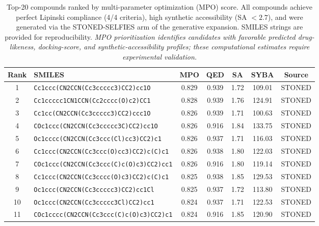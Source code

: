 \documentclass[journal=jcisd8,manuscript=suppinfo]{achemso}
\begin{document}
\begin{table}[!htbp]
\centering
\caption{Top-20 compounds ranked by multi-parameter optimization (MPO) score. All compounds achieve perfect Lipinski compliance (\num{4}/\num{4} criteria), high synthetic accessibility (SA $< \num{2.7}$), and were generated via the STONED-SELFIES arm of the generative expansion. SMILES strings are provided for reproducibility. \textit{MPO prioritization identifies candidates with favorable predicted drug-likeness, docking-score, and synthetic-accessibility profiles; these computational estimates require experimental validation.}}
\label{tab:top20_mpo}
\small
\begin{tabular}{@{}c p{8.25cm} c c c c c@{}}
\toprule
\textbf{Rank} & \textbf{SMILES} & \textbf{MPO} & \textbf{QED} & \textbf{SA} & \textbf{SYBA} & \textbf{Source} \\
\midrule
\num{1} & \texttt{Cc1ccc(CN2CCN(Cc3ccccc3)CC2)cc1O} & \num{0.829} & \num{0.939} & \num{1.72} & \num{109.01} & STONED \\
\num{2} & \texttt{Cc1ccccc1CN1CCN(Cc2cccc(O)c2)CC1} & \num{0.828} & \num{0.939} & \num{1.76} & \num{124.91} & STONED \\
\num{3} & \texttt{Cc1cc(CN2CCN(Cc3ccccc3)CC2)ccc1O} & \num{0.826} & \num{0.939} & \num{1.71} & \num{100.63} & STONED \\
\num{4} & \texttt{COc1ccc(CN2CCN(Cc3ccccc3C)CC2)cc1O} & \num{0.826} & \num{0.916} & \num{1.84} & \num{133.75} & STONED \\
\num{5} & \texttt{Oc1cccc(CN2CCN(Cc3ccc(Cl)cc3)CC2)c1} & \num{0.826} & \num{0.937} & \num{1.71} & \num{116.03} & STONED \\
\num{6} & \texttt{Cc1ccc(CN2CCN(Cc3ccc(O)cc3)CC2)c(C)c1} & \num{0.826} & \num{0.938} & \num{1.80} & \num{122.03} & STONED \\
\num{7} & \texttt{COc1ccc(CN2CCN(Cc3ccc(C)c(O)c3)CC2)cc1} & \num{0.826} & \num{0.916} & \num{1.80} & \num{119.14} & STONED \\
\num{8} & \texttt{Cc1ccc(CN2CCN(Cc3cccc(O)c3)CC2)c(C)c1} & \num{0.825} & \num{0.938} & \num{1.85} & \num{129.53} & STONED \\
\num{9} & \texttt{Oc1ccc(CN2CCN(Cc3ccccc3)CC2)cc1Cl} & \num{0.825} & \num{0.937} & \num{1.72} & \num{113.80} & STONED \\
\num{10} & \texttt{Oc1ccc(CN2CCN(Cc3ccccc3Cl)CC2)cc1} & \num{0.824} & \num{0.937} & \num{1.71} & \num{122.53} & STONED \\
\num{11} & \texttt{COc1cccc(CN2CCN(Cc3ccc(C)c(O)c3)CC2)c1} & \num{0.824} & \num{0.916} & \num{1.85} & \num{120.90} & STONED \\

\end{tabular}
\end{table}
\end{document}

